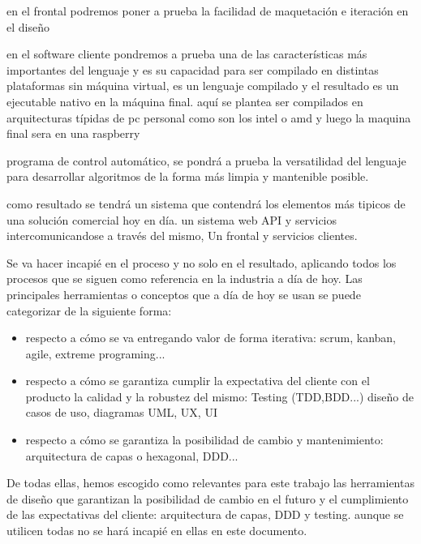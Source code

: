 en el frontal podremos poner a prueba la facilidad de maquetación e iteración en el diseño


en el software cliente pondremos a prueba una de las características más importantes del lenguaje y es su capacidad para ser compilado en distintas plataformas sin máquina virtual, es un lenguaje compilado y el resultado es un ejecutable nativo en la máquina final. aquí se plantea ser compilados en arquitecturas típidas de pc personal como son los intel o amd y luego la maquina final sera en una raspberry 


programa de control automático, se pondrá a prueba la versatilidad del lenguaje para desarrollar algoritmos de la forma más limpia y mantenible posible.


como resultado se tendrá un sistema que contendrá los elementos más tipicos de una solución comercial hoy en día. un sistema web API y servicios intercomunicandose a través del mismo, Un frontal y servicios clientes.


Se va hacer incapié en el proceso y no solo en el resultado, aplicando todos los procesos que se siguen como referencia en la industria a día de hoy.  Las principales herramientas o conceptos que a día de hoy se usan se puede categorizar de la siguiente forma:

\begin{itemize}
	\item respecto a cómo se va entregando valor de forma iterativa: scrum, kanban, agile, extreme programing...
	\item respecto a cómo se garantiza cumplir la expectativa del cliente con el producto la calidad y la robustez del mismo: Testing (TDD,BDD...) diseño de casos de uso, diagramas UML, UX, UI
	\item respecto a cómo se garantiza la posibilidad de cambio y mantenimiento: arquitectura de capas o hexagonal, DDD... 
\end{itemize} 

De todas ellas, hemos escogido como relevantes para este trabajo las herramientas de diseño que garantizan la posibilidad de cambio en el futuro y el cumplimiento de las expectativas del cliente: arquitectura de capas, DDD y testing. aunque se utilicen todas no se hará incapié en ellas en este documento.


